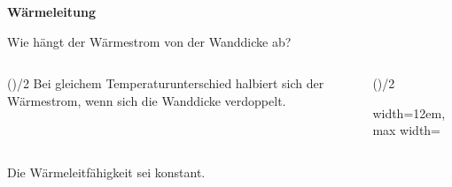 \begin{frame}[t]
\par\medskip\noindent\textbf{Wärmeleitung}\par


Wie hängt der Wärmestrom von der Wanddicke ab?

\begin{columns}[T,onlytextwidth]
\begin{column}{\dimexpr(\columnsep)/2\relax}
Bei gleichem Temperaturunterschied halbiert sich der Wärmestrom, wenn sich die Wanddicke verdoppelt.
\end{column}

\begin{column}{\dimexpr(\columnsep)/2\relax}
\par\begingroup\centering\noindent\begin{adjustbox}{width=12em,max width=\linewidth}


\end{adjustbox}\par
\par\endgroup
\end{column}
\end{columns}

Die Wärmeleitfähigkeit sei konstant.

\end{frame}

